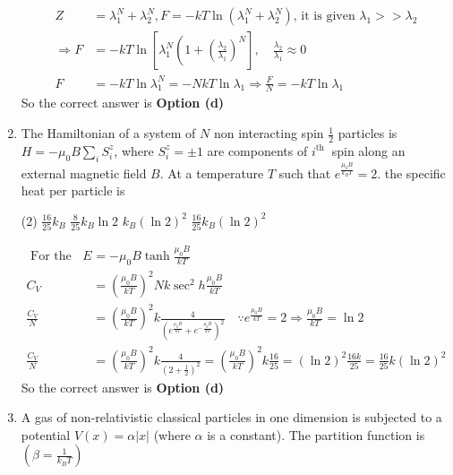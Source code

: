 \begin{enumerate}
\begin{tasks}
	\end{tasks}
	\begin{answer}
		\begin{align*}
		Z&=\lambda_{1}^{N}+\lambda_{2}^{N}, F=-k T \ln \left(\lambda_{1}^{N}+\lambda_{2}^{N}\right)\text{, it is given } \lambda_{1}>>\lambda_{2}\\
		\Rightarrow F&=-k T \ln \left[\lambda_{1}^{N}\left(1+\left(\frac{\lambda_{2}}{\lambda_{1}}\right)^{N}\right], \quad \frac{\lambda_{2}}{\lambda_{1}} \approx 0\right. \\
		F&=-k T \ln \lambda_{1}^{N}=-N k T \ln \lambda_{1} \Rightarrow \frac{F}{N}=-k T \ln \lambda_{1}
		\end{align*}
		So the correct answer is \textbf{Option (d)}
	\end{answer}
	\item The Hamiltonian of a system of $N$ non interacting spin $\frac{1}{2}$ particles is $H=-\mu_{0} B \sum_{i} S_{i}^{z}$, where $S_{i}^{z}=\pm 1$ are components of $i^{\text {th }}$ spin along an external magnetic field $B$. At a temperature $T$ such that $e^{\frac{\mu_{0} B}{k_{B} T}}=2$. the specific heat per particle is
	{	}
	\begin{tasks}(2)
		\task[\textbf{a.}]$\frac{16}{25} k_{B}$
		\task[\textbf{b.}] $\frac{8}{25} k_{B} \ln 2$
		\task[\textbf{c.}]$k_{B}(\ln 2)^{2}$
		\task[\textbf{d.}]  $\frac{16}{25} k_{B}(\ln 2)^{2}$
	\end{tasks}
	\begin{answer}
		\begin{align*}
		\text {  For the given system } E&=-\mu_{0} B \tanh \frac{\mu_{0} B}{k T}\\
		C_{V}&=\left(\frac{\mu_{0} B}{k T}\right)^{2} N k \sec ^{2} h \frac{\mu_{0} B}{k T}\\
		\frac{C_{V}}{N}&=\left(\frac{\mu_{0} B}{k T}\right)^{2} k \frac{4}{\left(e^{\frac{\mu_{0} B}{k T}}+e^{-\frac{\mu_{0} B}{k T}}\right)^{2}} \quad \because e^{\frac{\mu_{0} B}{k T}}=2 \Rightarrow \frac{\mu_{0} B}{k T}=\ln 2\\
		\frac{C_{V}}{N}&=\left(\frac{\mu_{0} B}{k T}\right)^{2} k \frac{4}{\left(2+\frac{1}{2}\right)^{2}}=\left(\frac{\mu_{0} B}{k T}\right)^{2} k \frac{16}{25}=(\ln 2)^{2} \frac{16 k}{25}=\frac{16}{25} k(\ln 2)^{2}
		\end{align*}
		So the correct answer is \textbf{Option (d)}
	\end{answer}
	\item A gas of non-relativistic classical particles in one dimension is subjected to a potential $V(x)=\alpha|x|$ (where $\alpha$ is a constant). The partition function is $\left(\beta=\frac{1}{k_{B} T}\right)$

\end{enumerate}
